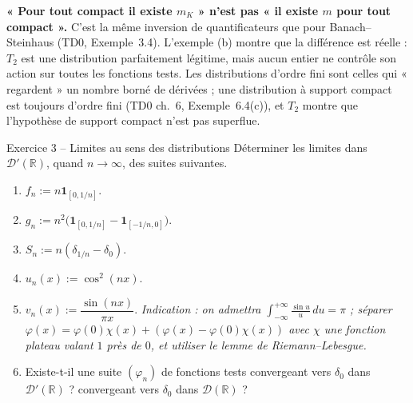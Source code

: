 \documentclass[11pt,a4paper]{article}
\newcommand{\R}{\mathbb{R}}
\newcommand{\D}{\mathcal{D}}
\theoremstyle{definition}
\begin{document}
\begin{piege}
\textbf{« Pour tout compact il existe $m_K$ » n'est pas « il existe $m$ pour tout compact ».} C'est la même inversion de quantificateurs que pour Banach--Steinhaus (TD0, Exemple~3.4). L'exemple (b) montre que la différence est réelle : $T_2$ est une distribution parfaitement légitime, mais aucun entier ne contrôle son action sur toutes les fonctions tests. Les distributions d'ordre fini sont celles qui « regardent » un nombre borné de dérivées ; une distribution à support compact est toujours d'ordre fini (TD0 ch.~6, Exemple~6.4(c)), et $T_2$ montre que l'hypothèse de support compact n'est pas superflue.
\end{piege}

\begin{exo}{Exercice 3 -- Limites au sens des distributions}
Déterminer les limites dans $\D'(\R)$, quand $n\to\infty$, des suites suivantes.
\begin{enumerate}[label=(\alph*)]
  \item $f_n:=n\mathbf 1_{[0,1/n]}$.
  \item $g_n:=n^2\big(\mathbf 1_{[0,1/n]}-\mathbf 1_{[-1/n,0]}\big)$.
  \item $S_n:=n(\delta_{1/n}-\delta_0)$.
  \item $u_n(x):=\cos^2(nx)$.
  \item $v_n(x):=\dfrac{\sin(nx)}{\pi x}$. \emph{Indication : on admettra $\int_{-\infty}^{+\infty}\frac{\sin u}u\,du=\pi$ ; séparer $\varphi(x)=\varphi(0)\chi(x)+(\varphi(x)-\varphi(0)\chi(x))$ avec $\chi$ une fonction plateau valant $1$ près de $0$, et utiliser le lemme de Riemann--Lebesgue.}
  \item Existe-t-il une suite $(\varphi_n)$ de fonctions tests convergeant vers $\delta_0$ dans $\D'(\R)$ ? convergeant vers $\delta_0$ dans $\D(\R)$ ?
\end{enumerate}
\end{exo}
\end{document}
